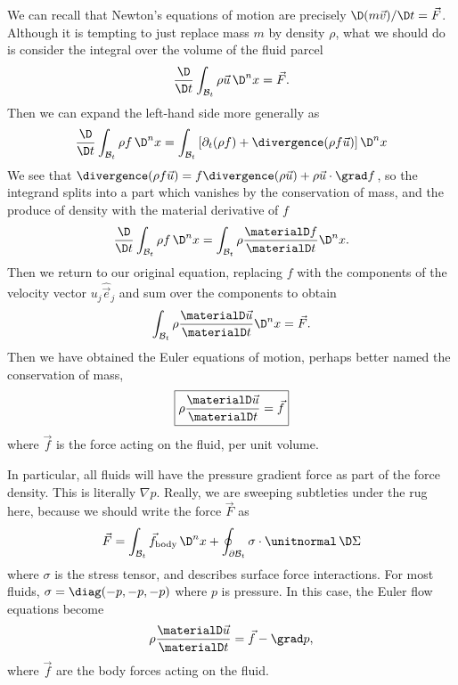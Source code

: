 \begin{node}\label{fluids:euler-flow-0001}%
We can recall that Newton's equations of motion are precisely
$\D(m\vec{v})/\D t = \vec{F}$. Although it is tempting to just replace
mass $m$ by density $\rho$, what we should do is consider the integral
over the volume of the fluid parcel
\begin{equation}
\frac{\D}{\D t}\int_{\mathcal{B}_{t}}\rho\vec{u}\,\D^{n}x = \vec{F}.
\end{equation}
Then we can expand the left-hand side more generally as
\begin{equation}
\frac{\D}{\D t}\int_{\mathcal{B}_{t}}\rho f\,\D^{n}x = 
\int_{\mathcal{B}_{t}}\left[\partial_{t}(\rho f)+\divergence(\rho f\vec{u})\right]\D^{n}x
\end{equation}
We see that $\divergence(\rho
f\vec{u})=f\divergence(\rho\vec{u})+\rho\vec{u}\cdot\grad f$, so the
integrand splits into a part which vanishes by the conservation of mass,
and the produce of density with the material derivative of $f$
\begin{equation}
\frac{\D}{\D t}\int_{\mathcal{B}_{t}}\rho f\,\D^{n}x = 
\int_{\mathcal{B}_{t}}\rho\frac{\materialD f}{\materialD t}\D^{n}x.
\end{equation}
Then we return to our original equation, replacing $f$ with the
components of the velocity vector $u_{j}\widehat{\vec{e}}_{j}$
and sum over the components to obtain
\begin{equation}
\int_{\mathcal{B}_{t}}\rho\frac{\materialD\vec{u}}{\materialD t}\D^{n}x = \vec{F}.
\end{equation}
Then we have obtained the Euler equations of motion, perhaps better
named the conservation of mass,
\begin{equation}
\boxed{\rho\frac{\materialD\vec{u}}{\materialD t}=\vec{f}}
\end{equation}
where $\vec{f}$ is the force acting on the fluid, per unit volume.

\begin{node}\label{fluids:euler-flow-0005}%
In particular, all fluids will have the pressure gradient force as part
of the force density. This is literally $\nabla p$. Really, we are
sweeping subtleties under the rug here, because we should write the
force $\vec{F}$ as
\begin{equation*}
\vec{F}=\int_{\mathcal{B}_{t}}\vec{f}_{\text{body}}\,\D^{n}x+\oint_{\partial\mathcal{B}_{t}}\sigma\cdot\unitnormal\,\D\Sigma
\end{equation*}
where $\sigma$ is the stress tensor, and describes surface force
interactions. For most fluids, $\sigma=\diag(-p,-p,-p)$ where $p$ is pressure.
In this case, the Euler flow equations become
\begin{equation}
\rho\frac{\materialD\vec{u}}{\materialD t}=\vec{f}-\grad p,
\end{equation}
where $\vec{f}$ are the body forces acting on the fluid.
\end{node}


\end{node}
